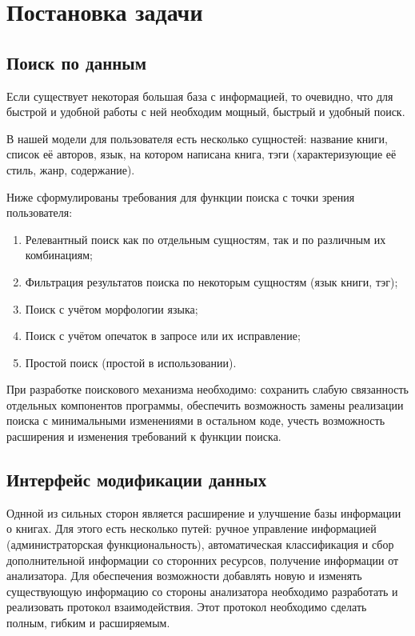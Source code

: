 
\section{Постановка задачи}

\subsection{Поиск по данным}

Если существует некоторая большая база с информацией, то очевидно, 
что для быстрой и удобной работы с ней необходим мощный, быстрый и удобный поиск.

В нашей модели для пользователя есть несколько сущностей: название книги, 
список её авторов, язык, на котором написана книга, тэги (характеризующие её стиль, жанр, содержание).

Ниже сформулированы требования для функции поиска с точки зрения пользователя:
\begin{enumerate}
  \item  Релевантный поиск как по отдельным сущностям, так и по различным их комбинациям;
  \item  Фильтрация результатов поиска по некоторым сущностям (язык книги, тэг);
  \item  Поиск с учётом морфологии языка;
  \item  Поиск с учётом опечаток в запросе или их исправление;
  \item  Простой поиск (простой в использовании).
\end{enumerate}

При разработке поискового механизма необходимо: сохранить слабую связанность отдельных компонентов программы, обеспечить возможность замены реализации поиска с минимальными изменениями в остальном коде, учесть возможность расширения и изменения требований к функции поиска.



\subsection{Интерфейс модификации данных}

Однной из сильных сторон является расширение и улучшение базы информации о книгах.
Для этого есть несколько путей: ручное управление информацией (администраторская функциональность), автоматическая классификация и сбор дополнительной информации со сторонних ресурсов, получение информации от анализатора.
Для обеспечения возможности добавлять новую и изменять существующую информацию со стороны анализатора необходимо разработать и реализовать протокол взаимодействия.
Этот протокол необходимо сделать полным, гибким и расширяемым.
